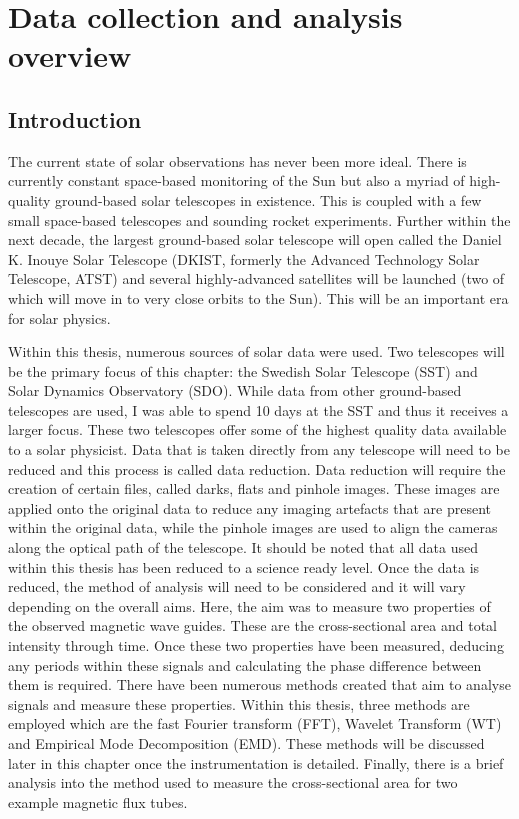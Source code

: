 \graphicspath{{Chapter2/Figs/}}

\chapter{Data collection and analysis overview}
	
	\vspace*{\fill}\par
    \pagebreak
	 
\section{Introduction}

	The current state of solar observations has never been more ideal.
	There is currently constant space-based monitoring of the Sun but also a myriad of high-quality ground-based solar telescopes in existence.
    This is coupled with a few small space-based telescopes and sounding rocket experiments.
	Further within the next decade, the largest ground-based solar telescope will open called the Daniel K. Inouye Solar Telescope (DKIST, formerly the Advanced Technology Solar Telescope, ATST) and several highly-advanced satellites will be launched (two of which will move in to very close orbits to the Sun).
	This will be an important era for solar physics.
	
	Within this thesis, numerous sources of solar data were used.
	Two telescopes will be the primary focus of this chapter: the Swedish Solar Telescope (SST) and Solar Dynamics Observatory (SDO).
	While data from other ground-based telescopes are used, I was able to spend 10 days at the SST and thus it receives a larger focus.
	These two telescopes offer some of the highest quality data available to a solar physicist.
	Data that is taken directly from any telescope will need to be reduced and this process is called data reduction. 
	Data reduction will require the creation of certain files, called darks, flats and pinhole images.
	These images are applied onto the original data to reduce any imaging artefacts that are present within the original data, while the pinhole images are used to align the cameras along the optical path of the telescope.
	It should be noted that all data used within this thesis has been reduced to a science ready level.
	Once the data is reduced, the method of analysis will need to be considered and it will vary depending on the overall aims.
	Here, the aim was to measure two properties of the observed magnetic wave guides.
    These are the cross-sectional area and total intensity through time.
    Once these two properties have been measured, deducing any periods within these signals and calculating the phase difference between them is required.
    There have been numerous methods created that aim to analyse signals and measure these properties.
    Within this thesis, three methods are employed which are the fast Fourier transform (FFT), Wavelet Transform (WT) and Empirical Mode Decomposition (EMD).  
    These methods will be discussed later in this chapter once the instrumentation is detailed.
    Finally, there is a brief analysis into the method used to measure the cross-sectional area for two example magnetic flux tubes.
	
